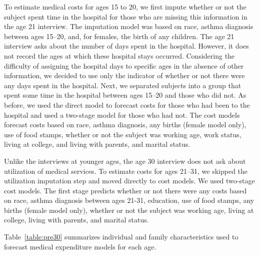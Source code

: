 \noindent To estimate medical costs for ages 15 to 20, we first impute whether or not the subject spent time in the hospital for those who are missing this information in the age 21 interview. The imputation model was based on race, asthma diagnosis between ages 15--20, and, for females, the birth of any children. The age 21 interview asks about the number of days spent in the hospital. However, it does not record the ages at which these hospital stays occurred. Considering the difficulty of assigning the hospital days to specific ages in the absence of other information, we decided to use only the indicator of whether or not there were any days spent in the hospital. Next, we separated subjects into a group that spent some time in the hospital between ages 15--20 and those who did not. As before, we used the direct model to forecast costs for those who had been to the hospital and used a two-stage model for those who had not. The cost models forecast costs based on race, asthma diagnosis, any births (female model only), use of food stamps, whether or not the subject was working age, work status, living at college, and living with parents, and marital status.

\noindent Unlike the interviews at younger ages, the age 30 interview does not ask about utilization of medical services. To estimate costs for ages 21--31, we skipped the utilization imputation step and moved directly to cost models. We used two-stage cost models. The first stage predicts whether or not there were any costs based on race, asthma diagnosis between ages 21-31, education, use of food stamps, any births (female model only), whether or not the subject was working age, living at college, living with parents, and marital status.

\noindent Table~\ref{table:pre30} summarizes individual and family characteristics used to forecast medical expenditure models for each age.


